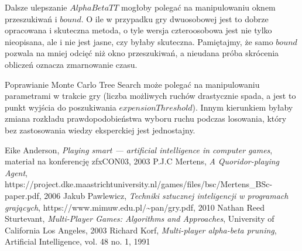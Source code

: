\documentclass{pracamgr}
\begin{document}
Dalsze ulepszanie \(AlphaBetaTT\) mogłoby polegać na manipulowaniu oknem przeszukiwań i \(bound\).
O ile w przypadku gry dwuosobowej jest to dobrze opracowana i skuteczna metoda, o tyle wersja czteroosobowa jest nie tylko nieopisana, ale i nie jest jasne, czy byłaby skuteczna.
Pamiętajmy, że samo \(bound\) pozwala na mniej odcięć niż okno przeszukiwań, a nieudana próba skrócenia obliczeń oznacza zmarnowanie czasu.

Poprawianie Monte Carlo Tree Search może polegać na manipulowaniu parametrami w trakcie gry (liczba możliwych ruchów drastycznie spada, a jest to punkt wyjścia do poszukiwania \(expensionThreshold\)).
Innym kierunkiem byłaby zmiana rozkładu prawdopodobieństwa wyboru ruchu podczas losowania, który bez zastosowania wiedzy eksperckiej jest jednostajny.

\begin{thebibliography}{98}

 Eike Anderson, \textit{Playing smart --- artificial intelligence in computer games}, materiał na konferencję zfxCON03, 2003
 P.J.C Mertens, \textit{A Quoridor-playing Agent},\\https://project.dke.maastrichtuniversity.nl/games/files/bsc/Mertens\_BSc-paper.pdf, 2006
 Jakub Pawlewicz, \textit{Techniki sztucznej inteligencji
    w programach grających}, https://www.mimuw.edu.pl/\textasciitilde{}pan/gry.pdf, 2010
 Nathan Reed Sturtevant, \textit{Multi-Player Games: Algorithms and Approaches}, University of California Los Angeles, 2003
 Richard Korf, \textit{Multi-player alpha-beta pruning}, Artificial Intelligence, vol. 48 no. 1, 1991

\end{thebibliography}
\end{document}
